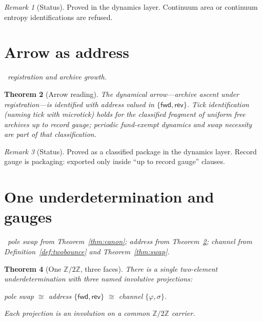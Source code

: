 \documentclass[11pt,a4paper]{article}
\theoremstyle{plain}
\newtheorem{theorem}{Theorem}[section]
\theoremstyle{definition}
\theoremstyle{remark}
\newtheorem{remark}[theorem]{Remark}
\newcommand{\Ztwo}{\mathbb{Z}/2\mathbb{Z}}
\newcommand{\dep}[1]{%
  \par\noindent{\small\color{muted}\sffamily Dependence:}~\textit{#1}\par\medskip}
\begin{document}
\begin{remark}[Status]
Proved in the dynamics layer. Continuum area or continuum entropy
identifications are refused.
\end{remark}


\section{Arrow as address}
\label{sec:arrow}

\dep{registration and archive growth.}

\begin{theorem}[Arrow reading]
\label{thm:arrow}
The dynamical arrow---archive ascent under registration---is identified
with address valued in $\{\mathsf{fwd},\mathsf{rev}\}$. Tick identification
(naming tick with microtick) holds for the classified fragment of
uniform free archives up to record gauge; periodic fund-exempt dynamics
and swap necessity are part of that classification.
\end{theorem}

\begin{remark}[Status]
Proved as a classified package in the dynamics layer. Record gauge is
packaging: exported only inside ``up to record gauge'' clauses.
\end{remark}


\Needspace{18em}
\section{One underdetermination and gauges}
\label{sec:z2}

\dep{pole swap from Theorem~\ref{thm:canon}; address from
Theorem~\ref{thm:arrow}; channel from Definition~\ref{def:twobounce} and
Theorem~\ref{thm:swap}.}

\begin{theorem}[One $\Ztwo$, three faces]
\label{thm:z2}
There is a single two-element underdetermination with three named
involutive projections:
\begin{center}
pole swap \quad$\cong$\quad
address $\{\mathsf{fwd},\mathsf{rev}\}$ \quad$\cong$\quad
channel $\{\varphi,\sigma\}$.
\end{center}
Each projection is an involution on a common $\Ztwo$ carrier.
\end{theorem}
\end{document}
